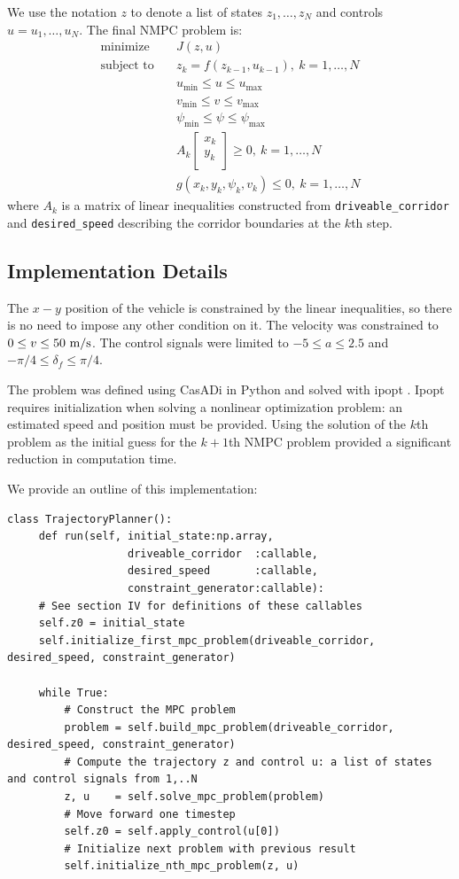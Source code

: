 \documentclass[letterpaper, 10 pt, conference]{ieeeconf}  %
\begin{document}
 We use the notation $z$ to denote a list of states $z_1,\dots,z_N$ and controls $u=u_1,\dots,u_N$.
 The final NMPC problem is:
 \begin{align}
 \text{minimize}\quad& J(z, u)
 \\
 \text{subject to} \quad& z_{k} = f(z_{k-1}, u_{k-1}),\ k=1,\dots,N
 \\
 & u_{\min} \leq u \leq u_{\max}
 \\
 & v_{\min} \leq v \leq v_{\max}
 \\
 & \psi_{\min} \leq \psi \leq \psi_{\max}
 \\
 &
 A_k\begin{bmatrix}
 x_k\\y_k\\
 \end{bmatrix} \geq 0,\ k=1,\dots,N
 \\
 &
g(x_k, y_k, \psi_k, v_k) \leq 0,\ k=1,\dots,N
 \end{align}
 where $A_k$ is a matrix of linear inequalities constructed from \texttt{driveable\_corridor} and \texttt{desired\_speed} describing the corridor boundaries at the $k$th step.
 
 
 \subsection{Implementation Details}
The $x-y$ position of the vehicle is constrained by the linear inequalities, so there is no need to impose any other condition on it. The velocity was constrained to $0 \leq v \leq 50\ \text{m}/\text{s}$.
The control signals were limited to $-5 \leq a \leq 2.5$ and $-\pi/4 \leq \delta_f \leq \pi/4$.
 
 The problem was defined using CasADi in Python and solved with ipopt \cite{Casadi} \cite{ipopt}. Ipopt requires initialization when solving a nonlinear optimization problem: an estimated speed and position must be provided. Using the solution of the $k$th problem as the initial guess for the $k+1$th NMPC problem provided a significant reduction in computation time.
 
 We provide an outline of this implementation:
 \begin{lstlisting}[caption={Nonlinear MPC trajectory planner using proposed API.},style=Python]
 class TrajectoryPlanner():
     def run(self, initial_state:np.array,
                   driveable_corridor  :callable,
                   desired_speed       :callable,
                   constraint_generator:callable):
     # See section IV for definitions of these callables
     self.z0 = initial_state
     self.initialize_first_mpc_problem(driveable_corridor, desired_speed, constraint_generator)
 
     while True:
         # Construct the MPC problem
         problem = self.build_mpc_problem(driveable_corridor, desired_speed, constraint_generator)
         # Compute the trajectory z and control u: a list of states and control signals from 1,..N
         z, u    = self.solve_mpc_problem(problem)
         # Move forward one timestep
         self.z0 = self.apply_control(u[0])
         # Initialize next problem with previous result
         self.initialize_nth_mpc_problem(z, u)
 \end{lstlisting}
 
\end{document}
